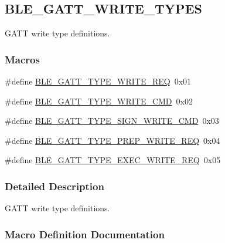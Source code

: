 \hypertarget{group___b_l_e___g_a_t_t___w_r_i_t_e___t_y_p_e_s}{}\subsection{B\+L\+E\+\_\+\+G\+A\+T\+T\+\_\+\+W\+R\+I\+T\+E\+\_\+\+T\+Y\+P\+ES}
\label{group___b_l_e___g_a_t_t___w_r_i_t_e___t_y_p_e_s}


G\+A\+TT write type definitions.  


\subsubsection*{Macros}
\begin{DoxyCompactItemize}
\item 
\#define \hyperlink{group___b_l_e___g_a_t_t___w_r_i_t_e___t_y_p_e_s_ga50990e9514a3d5f42cf88a14b494e5b0}{B\+L\+E\+\_\+\+G\+A\+T\+T\+\_\+\+T\+Y\+P\+E\+\_\+\+W\+R\+I\+T\+E\+\_\+\+R\+EQ}~0x01
\item 
\#define \hyperlink{group___b_l_e___g_a_t_t___w_r_i_t_e___t_y_p_e_s_ga7468b2af79bfe91002fca454fe569d4c}{B\+L\+E\+\_\+\+G\+A\+T\+T\+\_\+\+T\+Y\+P\+E\+\_\+\+W\+R\+I\+T\+E\+\_\+\+C\+MD}~0x02
\item 
\#define \hyperlink{group___b_l_e___g_a_t_t___w_r_i_t_e___t_y_p_e_s_gad906c2fd173e160c298a5f90d79a077c}{B\+L\+E\+\_\+\+G\+A\+T\+T\+\_\+\+T\+Y\+P\+E\+\_\+\+S\+I\+G\+N\+\_\+\+W\+R\+I\+T\+E\+\_\+\+C\+MD}~0x03
\item 
\#define \hyperlink{group___b_l_e___g_a_t_t___w_r_i_t_e___t_y_p_e_s_ga4ebcedb62a4de9e99b20274a8107fc45}{B\+L\+E\+\_\+\+G\+A\+T\+T\+\_\+\+T\+Y\+P\+E\+\_\+\+P\+R\+E\+P\+\_\+\+W\+R\+I\+T\+E\+\_\+\+R\+EQ}~0x04
\item 
\#define \hyperlink{group___b_l_e___g_a_t_t___w_r_i_t_e___t_y_p_e_s_gabe01f110c852cf285164b326fd670ee6}{B\+L\+E\+\_\+\+G\+A\+T\+T\+\_\+\+T\+Y\+P\+E\+\_\+\+E\+X\+E\+C\+\_\+\+W\+R\+I\+T\+E\+\_\+\+R\+EQ}~0x05
\end{DoxyCompactItemize}


\subsubsection{Detailed Description}
G\+A\+TT write type definitions. 



\subsubsection{Macro Definition Documentation}
